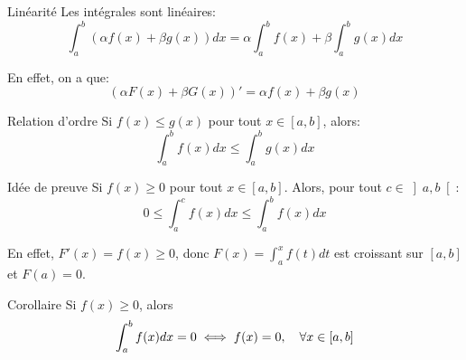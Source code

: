 \documentclass[a4paper]{article}
\begin{document}
\begin{parag}{Linéarité}
    Les intégrales sont linéaires:
    \[\int_{a}^{b} \left(\alpha f\left(x\right) + \beta g\left(x\right)\right)dx = \alpha \int_{a}^{b} f\left(x\right) + \beta \int_{a}^{b} g\left(x\right)dx\]

    En effet, on a que: 
    \[\left(\alpha F\left(x\right) + \beta G\left(x\right)\right)' = \alpha f\left(x\right) + \beta g\left(x\right)\]
\end{parag}

\begin{parag}{Relation d'ordre}
    Si $f\left(x\right) \leq g\left(x\right)$ pour tout $x \in \left[a, b\right] $, alors: 
    \[\int_{a}^{b} f\left(x\right)dx \leq \int_{a}^{b} g\left(x\right) dx\]

    \begin{subparag}{Idée de preuve}
        Si $f\left(x\right) \geq 0$ pour tout $x \in \left[a, b\right]$. Alors, pour tout $c \in \left]a, b\right[ $: 
        \[0 \leq \int_{a}^{c} f\left(x\right) dx \leq \int_{a}^{b} f\left(x\right)dx\]
    
        En effet, $F'\left(x\right) = f\left(x\right) \geq 0$, donc $F\left(x\right) = \int_{a}^{x} f\left(t\right)dt$ est croissant sur $\left[a, b\right]$ et $F\left(a\right) = 0$.
    \end{subparag}

    \begin{subparag}{Corollaire}
        Si $f\left(x\right) \geq 0$, alors 
        \[\int_{a}^{b} f\left(x\right)dx = 0 \iff f\left(x\right) = 0, \mathspace \forall x \in \left[a, b\right] \] 
    \end{subparag}
\end{parag}
\end{document}
